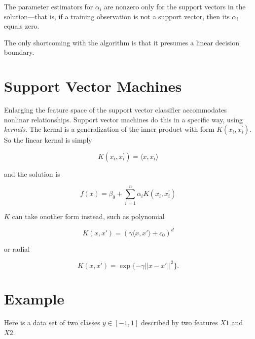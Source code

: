 \documentclass[
]{book}
\newenvironment{Shaded}{\begin{snugshade}}{\end{snugshade}}
\newcommand{\DataTypeTok}[1]{\textcolor[rgb]{0.13,0.29,0.53}{#1}}
\newcommand{\DecValTok}[1]{\textcolor[rgb]{0.00,0.00,0.81}{#1}}
\newcommand{\KeywordTok}[1]{\textcolor[rgb]{0.13,0.29,0.53}{\textbf{#1}}}
\newcommand{\NormalTok}[1]{#1}
\newcommand{\OperatorTok}[1]{\textcolor[rgb]{0.81,0.36,0.00}{\textbf{#1}}}
\newcommand{\StringTok}[1]{\textcolor[rgb]{0.31,0.60,0.02}{#1}}
\begin{document}
The parameter estimators for \(\alpha_i\) are nonzero only for the support vectors in the solution---that is, if a training observation is not a support vector, then its \(\alpha_i\) equals zero.

The only shortcoming with the algorithm is that it presumes a linear decision boundary.

\hypertarget{support-vector-machines-1}{%
\section{Support Vector Machines}\label{support-vector-machines-1}}

Enlarging the feature space of the support vector classifier accommodates nonlinar relationships. Support vector machines do this in a specific way, using \emph{kernals}. The kernal is a generalization of the inner product with form \(K(x_i, x_i^{'})\). So the linear kernal is simply

\[K(x_i, x_i^{'}) = \langle x, x_i \rangle\]

and the solution is

\[f(x) = \beta_0 + \sum_{i = 1}^n {\alpha_i K(x_i, x_i^{'})}\]

\(K\) can take onother form instead, such as polynomial

\[K(x, x') = (\gamma \langle x, x' \rangle + c_0)^d\]

or radial

\[K(x, x') = \exp\{-\gamma ||x - x'||^2\}.\]

\hypertarget{example-2}{%
\section{Example}\label{example-2}}

Here is a data set of two classes \(y \in [-1, 1]\) described by two features \(X1\) and \(X2\).

\begin{Shaded}
\end{Shaded}
\end{document}

